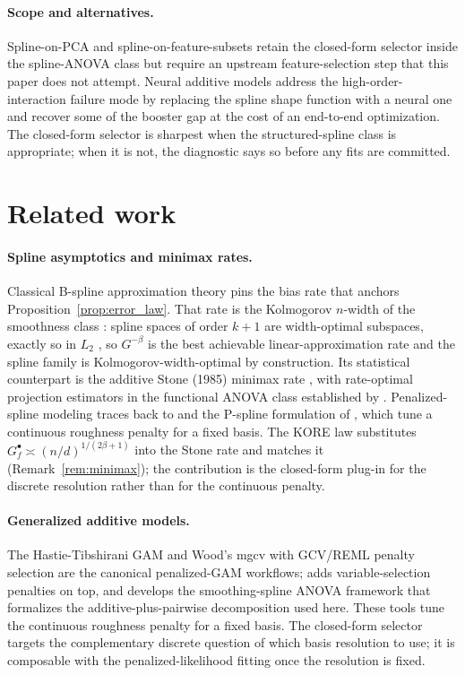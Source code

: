 \documentclass{article}
\begin{document}
\paragraph{Scope and alternatives.}
Spline-on-PCA and spline-on-feature-subsets retain the closed-form selector inside the spline-ANOVA class but require an upstream feature-selection step that this paper does not attempt. Neural additive models \citep{agarwal2021nam,chang2022nodegam} address the high-order-interaction failure mode by replacing the spline shape function with a neural one and recover some of the booster gap at the cost of an end-to-end optimization. The closed-form selector is sharpest when the structured-spline class is appropriate; when it is not, the diagnostic says so before any fits are committed.

\section{Related work}
\label{sec:related}

\paragraph{Spline asymptotics and minimax rates.}
Classical B-spline approximation theory \citep{deboor2001,schumaker2007} pins the bias rate that anchors Proposition~\ref{prop:error_law}. That rate is the Kolmogorov $n$-width of the smoothness class \citep{kolmogorov1936,pinkus1985}: spline spaces of order $k+1$ are width-optimal subspaces, exactly so in $L_2$ \citep{melkman1978}, so $G^{-\beta}$ is the best achievable linear-approximation rate and the spline family is Kolmogorov-width-optimal by construction. Its statistical counterpart is the additive Stone (1985) minimax rate \citep{stone1985,stone1982}, with rate-optimal projection estimators in the functional ANOVA class established by \citet{huang1998}. Penalized-spline modeling traces back to \citet{wahba1990} and the P-spline formulation of \citet{eilers1996}, which tune a continuous roughness penalty for a fixed basis. The KORE law substitutes $G_f^\bullet \asymp (n/d)^{1/(2\beta+1)}$ into the Stone rate and matches it (Remark~\ref{rem:minimax}); the contribution is the closed-form plug-in for the discrete resolution rather than for the continuous penalty.

\paragraph{Generalized additive models.}
The Hastie-Tibshirani GAM \citep{hastie1990} and Wood's mgcv with GCV/REML penalty selection \citep{wood2003,wood2017} are the canonical penalized-GAM workflows; \citet{marra2011} adds variable-selection penalties on top, and \citet{gu2013} develops the smoothing-spline ANOVA framework that formalizes the additive-plus-pairwise decomposition used here. These tools tune the continuous roughness penalty for a fixed basis. The closed-form selector targets the complementary discrete question of which basis resolution to use; it is composable with the penalized-likelihood fitting once the resolution is fixed.
\end{document}
